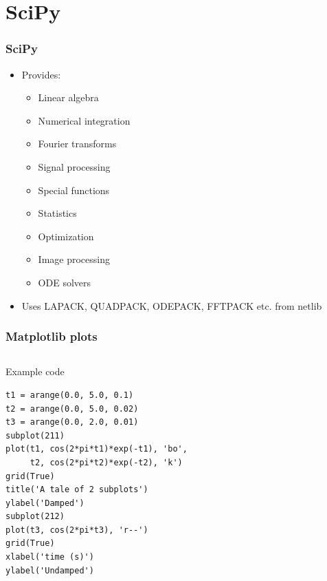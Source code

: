 \documentclass[14pt,compress]{beamer}
\newcounter{time}
\begin{document}
\section{SciPy}
\begin{frame}[plain]
  \frametitle{SciPy}
  \begin{itemize}
  \item Provides:
    \begin{itemize}
    \item Linear algebra
    \item Numerical integration
    \item Fourier transforms
    \item Signal processing
    \item Special functions
    \item Statistics
    \item Optimization
    \item Image processing
    \item ODE solvers
    \end{itemize}
  \item Uses LAPACK, QUADPACK, ODEPACK, FFTPACK etc. from netlib
  \end{itemize}
\end{frame}



\begin{frame}
  \frametitle{Matplotlib plots}
  \begin{columns}
    \hspace*{-0.5in}
    \begin{block}{Example code}
    \tiny
\begin{lstlisting}
t1 = arange(0.0, 5.0, 0.1)
t2 = arange(0.0, 5.0, 0.02)
t3 = arange(0.0, 2.0, 0.01)
subplot(211)
plot(t1, cos(2*pi*t1)*exp(-t1), 'bo', 
     t2, cos(2*pi*t2)*exp(-t2), 'k')
grid(True)
title('A tale of 2 subplots')
ylabel('Damped')
subplot(212)
plot(t3, cos(2*pi*t3), 'r--')
grid(True)
xlabel('time (s)')
ylabel('Undamped')
\end{lstlisting}
    \end{block}
  \end{columns}
\end{frame}

\begin{frame}[plain]
    \begin{center}
    \end{center}
\end{frame}
\begin{frame}[plain]
    \begin{center}
    \end{center}
\end{frame}
\end{document}
